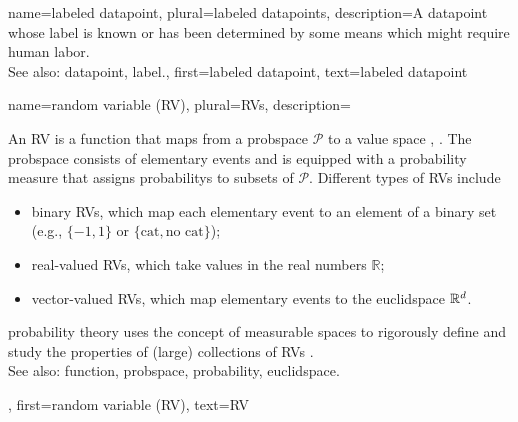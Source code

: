 {name={labeled datapoint}, plural={labeled datapoints},
 	description={A \gls{datapoint} whose \gls{label} is known or has been determined 
 		by some means which might require human labor.
			\\
		See also: \gls{datapoint}, \gls{label}.},
 	first={labeled datapoint},
 	text={labeled datapoint}  
}

{name={random variable (RV)}, plural={RVs},
 	description={An RV is a \gls{function} that maps from 
 		a \gls{probspace} $\mathcal{P}$ to a value space \cite{BillingsleyProbMeasure}, \cite{GrayProbBook}. 
 		The \gls{probspace} consists of elementary events and is equipped with a \gls{probability} 
 		measure that assigns \glspl{probability} to subsets of $\mathcal{P}$. 
 		Different types of RVs include  
 		\begin{itemize} 
 			\item {binary RVs}, which map each elementary event to an element of a binary set (e.g., $\{-1,1\}$ or $\{\text{cat}, \text{no cat}\}$); 
 			\item {real-valued RVs}, which take values in the real numbers $\mathbb{R}$;  
 			\item {vector-valued RVs}, which map elementary events to the \gls{euclidspace} $\mathbb{R}^{d}$.  
 		\end{itemize} 
 		\Gls{probability} theory uses the concept of measurable spaces to rigorously define 
 		and study the properties of (large) collections of RVs \cite{BillingsleyProbMeasure}.
			\\
		See also: \gls{function}, \gls{probspace}, \gls{probability}, \gls{euclidspace}.}, 
	first={random variable (RV)},
	text={RV}  
}
 
